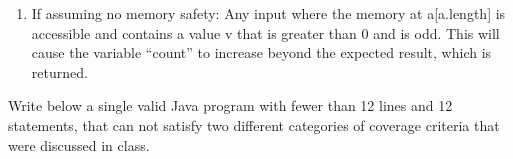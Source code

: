 \documentclass[addpoints]{exam}
\begin{document}
\begin{questions}
\begin{parts}
{\begin{enumerate}
		\item If assuming no memory safety: Any input where the memory at a[a.length] is accessible and contains a value v that is greater than 0 and is odd. This will cause the variable ``count'' to increase beyond the expected result, which is returned.
		\end{enumerate}
    }

\end{parts}

\newpage

\question Write below a single valid Java program with fewer than 12
  lines and 12 statements, that can not satisfy two different
  categories of coverage criteria that were discussed in class.

\end{questions}
\end{document}
